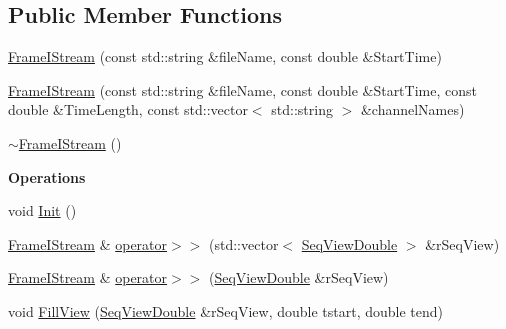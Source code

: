 \subsection*{Public Member Functions}
\begin{DoxyCompactItemize}
\item 
\hyperlink{classtsa_1_1_frame_i_stream_a5bd1cb2479b947745f39121ba638d23f}{Frame\+I\+Stream} (const std\+::string \&file\+Name, const double \&Start\+Time)
\item 
\hyperlink{classtsa_1_1_frame_i_stream_a12f14bd9445709d3f03dcb122dc89889}{Frame\+I\+Stream} (const std\+::string \&file\+Name, const double \&Start\+Time, const double \&Time\+Length, const std\+::vector$<$ std\+::string $>$ \&channel\+Names)
\item 
\hyperlink{classtsa_1_1_frame_i_stream_a867c0e6a3cd0c2405c038026880d268d}{$\sim$\+Frame\+I\+Stream} ()
\end{DoxyCompactItemize}
\begin{Indent}\textbf{ Operations}\par
\begin{DoxyCompactItemize}
\item 
void \hyperlink{classtsa_1_1_frame_i_stream_a9c53d0d13f4fe78ce0eef01af69e3f22}{Init} ()
\item 
\hyperlink{classtsa_1_1_frame_i_stream}{Frame\+I\+Stream} \& \hyperlink{classtsa_1_1_frame_i_stream_ad2ad3c75a6448ce8ce8f119aee4609e5}{operator$>$$>$} (std\+::vector$<$ \hyperlink{namespacetsa_ac599574bcc094eda25613724b8f3ca9e}{Seq\+View\+Double} $>$ \&r\+Seq\+View)
\item 
\hyperlink{classtsa_1_1_frame_i_stream}{Frame\+I\+Stream} \& \hyperlink{classtsa_1_1_frame_i_stream_a1d57b62edf1783696b7c52120dad9e5a}{operator$>$$>$} (\hyperlink{namespacetsa_ac599574bcc094eda25613724b8f3ca9e}{Seq\+View\+Double} \&r\+Seq\+View)
\item 
void \hyperlink{classtsa_1_1_frame_i_stream_a66b4e5b136f07fc3044865908364c913}{Fill\+View} (\hyperlink{namespacetsa_ac599574bcc094eda25613724b8f3ca9e}{Seq\+View\+Double} \&r\+Seq\+View, double tstart, double tend)
\end{DoxyCompactItemize}
\end{Indent}
